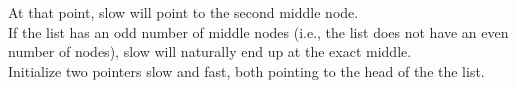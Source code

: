 \documentclass[preview]{standalone}
\begin{document}
At that point, slow will point to the second middle node.\\If the list has an odd number of middle nodes (i.e., the list does not have an even number of nodes), slow will naturally end up at the exact middle.\\Initialize two pointers slow and fast, both pointing to the head of the the list.\\
\end{document}
